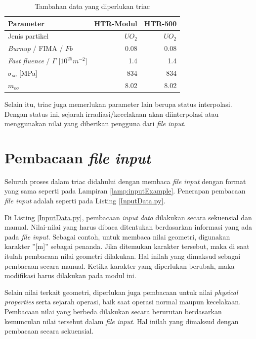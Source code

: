 \documentclass[a4paper,11pt]{report}
\newcommand{\ra}[1]{\renewcommand{\arraystretch}{#1}}
\begin{document}
\begin{table}[h]
  \caption[Tambahan data yang diperlukan triac]{Tambahan data yang diperlukan triac\cite{report1}}
  \label{tab:additionalData}

  \begin{center}
  \ra{1.3}
    \begin{tabular}{@{}lrr@{}}\toprule
    Parameter & HTR-Modul & HTR-500 \\ \midrule%
       Jenis partikel & $UO_2$ & $UO_2$ \\ 
       \textit{Burnup} / FIMA / $Fb$ & 0.08 & 0.08 \\
       \textit{Fast fluence} / $\Gamma$ [$10^{25}m^{-2}$] & 1.4 & 1.4 \\
       $\sigma_{oo}$ [MPa] & 834 & 834 \\
       $m_{oo}$ & 8.02 & 8.02 \\
       \bottomrule
    \end{tabular}
  \end{center}
\end{table}

Selain itu, triac juga memerlukan parameter lain berupa status interpolasi. Dengan status ini, sejarah irradiasi/kecelakaan akan diinterpolasi atau menggunakan nilai yang diberikan pengguna dari \textit{file input}.

\section{Pembacaan \textit{file input}}
\label{sec:fileinput}
Seluruh proses dalam triac didahului dengan membaca \textit{file input} dengan format yang sama seperti pada Lampiran \ref{lamp:inputExample}. Penerapan pembacaan \textit{file input} adalah seperti pada Listing \ref{InputData.py}.%

Di Listing \ref{InputData.py}, pembacaan \textit{input data} dilakukan secara sekuensial dan manual. Nilai-nilai yang harus dibaca ditentukan berdasarkan informasi yang ada pada \textit{file input}. Sebagai contoh, untuk membaca nilai geometri, digunakan karakter ''[m]'' sebagai penanda. Jika ditemukan karakter tersebut, maka di saat itulah pembacaan nilai geometri dilakukan. Hal inilah yang dimaksud sebagai pembacaan secara manual. Ketika karakter yang diperlukan berubah, maka modifikasi harus dilakukan pada modul ini.

Selain nilai terkait geometri, diperlukan juga pembacaan untuk nilai \textit{physical properties} serta sejarah operasi, baik saat operasi normal maupun kecelakaan. Pembacaan nilai yang berbeda dilakukan secara berurutan berdasarkan kemunculan nilai tersebut dalam \textit{file input}. Hal inilah yang dimaksud dengan pembacaan secara sekuensial.
\end{document}
